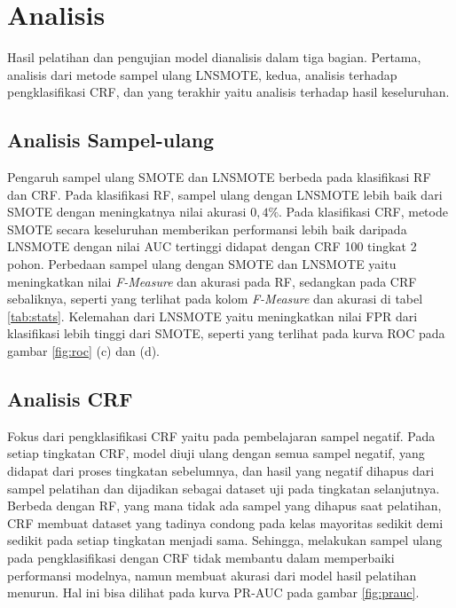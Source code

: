 \section{Analisis}

Hasil pelatihan dan pengujian model dianalisis dalam tiga bagian.
Pertama, analisis dari metode sampel ulang LNSMOTE, kedua, analisis terhadap
pengklasifikasi CRF, dan yang terakhir yaitu analisis terhadap hasil
keseluruhan.

\subsection{Analisis Sampel-ulang}

Pengaruh sampel ulang SMOTE dan LNSMOTE berbeda pada klasifikasi RF dan CRF.
Pada klasifikasi RF, sampel ulang dengan LNSMOTE lebih baik dari SMOTE dengan
meningkatnya nilai akurasi $0,4\%$.
Pada klasifikasi CRF, metode SMOTE secara keseluruhan memberikan performansi
lebih baik daripada LNSMOTE dengan nilai AUC tertinggi didapat dengan CRF 100
tingkat 2 pohon.
Perbedaan  sampel ulang dengan SMOTE dan LNSMOTE yaitu meningkatkan nilai
\textit{F-Measure} dan akurasi pada RF, sedangkan pada CRF sebaliknya, seperti
yang terlihat pada kolom \textit{F-Measure} dan akurasi di tabel
\ref{tab:stats}.
Kelemahan dari LNSMOTE yaitu meningkatkan nilai FPR dari
klasifikasi lebih tinggi dari SMOTE, seperti yang terlihat pada kurva ROC pada
gambar \ref{fig:roc} (c) dan (d).



\subsection{Analisis CRF}

Fokus dari pengklasifikasi CRF yaitu pada pembelajaran sampel negatif.
Pada setiap tingkatan CRF, model diuji ulang dengan semua sampel negatif, yang
didapat dari proses tingkatan sebelumnya, dan hasil yang negatif dihapus dari
sampel pelatihan dan dijadikan sebagai dataset uji pada tingkatan selanjutnya.
Berbeda dengan RF, yang mana tidak ada sampel yang dihapus saat
pelatihan, CRF membuat dataset yang tadinya condong pada kelas mayoritas
sedikit demi sedikit pada setiap tingkatan menjadi sama.
Sehingga, melakukan sampel ulang pada pengklasifikasi dengan CRF tidak membantu
dalam memperbaiki performansi modelnya, namun membuat akurasi dari model hasil
pelatihan menurun.
Hal ini bisa dilihat pada kurva PR-AUC pada gambar \ref{fig:prauc}.

